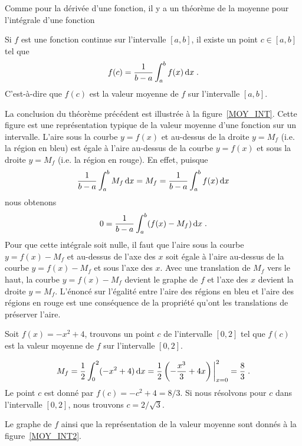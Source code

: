 {Comme pour la dérivée d'une fonction, il y a un théorème de la moyenne pour
l'intégrale d'une fonction

\begin{focus}{\thm}
Si $f$ est une fonction continue sur l'intervalle $[a,b]$, il existe un point
$c \in [a,b]$ tel que
\[
f(c) = \frac{1}{b-a} \int_a^b f(x) \,\mathrm{d}x \; .
\]
C'est-à-dire que $f(c)$ est la valeur moyenne de $f$ sur l'intervalle
$[a,b]$.
\end{focus}

La conclusion du théorème précédent est illustrée à la figure~\ref{MOY_INT}.
Cette figure est une représentation typique de la valeur moyenne d'une
fonction sur un intervalle.  L'aire sous la courbe $y=f(x)$ et au-dessus de
la droite $y=M_f$ (i.e. la région en bleu) est égale à l'aire
au-dessus de la courbe $y=f(x)$ et sous la droite $y=M_f$ (i.e. la
région en rouge).  En effet, puisque
\[
\frac{1}{b-a} \int_a^b M_f \,\mathrm{d}x = M_f = \frac{1}{b-a}\int_a^b f(x) \,\mathrm{d}x
\]
nous obtenons
\[
0 = \frac{1}{b-a}\int_a^b (f(x)-M_f) \,\mathrm{d}x \; .
\]
Pour que cette intégrale soit nulle, il faut que l'aire sous la courbe
$y=f(x)-M_f$ et au-dessus de l'axe des $x$ soit égale à l'aire au-dessus de
la courbe $y=f(x)-M_f$ et sous l'axe des $x$.  Avec une translation de $M_f$
vers le haut, la courbe $y = f(x)-M_f$ devient le graphe de $f$ et
l'axe des $x$ devient la droite $y=M_f$.  L'énoncé sur l'égalité
entre l'aire des régions en bleu et l'aire des régions en rouge est
une conséquence de la propriété qu'ont les translations de préserver
l'aire.


\begin{egg}
Soit $f(x) = -x^2+4$, trouvons un point $c$ de l'intervalle $[0,2]$ tel que
$f(c)$ est la valeur moyenne de $f$ sur l'intervalle $[0,2]$.

\[
M_f = \frac{1}{2} \int_0^2 (-x^2+4) \,\mathrm{d}x
= \frac{1}{2} \left(-\frac{x^3}{3} + 4x\right)\bigg|_{x=0}^2
= \frac{8}{3} \; .
\]
Le point $c$ est donné par $f(c) = -c^2+4 = 8/3$.  Si nous résolvons
pour $c$ dans l'intervalle $[0,2]$, nous trouvons $c= 2/\sqrt{3}$.

Le graphe de $f$ ainsi que la représentation de la valeur moyenne sont donnés
à la figure~\ref{MOY_INT2}.
\end{egg}

}
